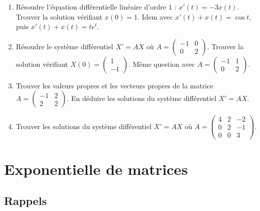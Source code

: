 \documentclass[12pt, class=report,crop=false]{standalone}
\begin{document}
\begin{miniexercices}
\sauteligne
\begin{enumerate}
  \item Résoudre l'équation différentielle linéaire d'ordre $1$ : $x'(t) = -3x(t)$.
  Trouver la solution vérifiant $x(0)=1$.
   Idem avec $x'(t)+x(t) = \cos t$, puis $x'(t) +x(t) = te^t$.
   
  \item Résoudre le système différentiel $X'=AX$ où
  $A = \left(\begin{smallmatrix}-1&0\\0&2\end{smallmatrix}\right)$. Trouver la solution vérifiant 
  $X(0) = \left(\begin{smallmatrix}1\\-1\end{smallmatrix}\right)$.
  Même question avec $A = \left(\begin{smallmatrix}-1&1\\0&2\end{smallmatrix}\right)$.
  
  \item Trouver les valeurs propres et les vecteurs propres de la matrice
  $A = \left(\begin{smallmatrix}-1&2\\2&2\end{smallmatrix}\right)$. En déduire les solutions du système différentiel $X'=AX$.
  
  \item Trouver les solutions du système différentiel $X'=AX$ où
  $A = \left(\begin{smallmatrix}4&2&-2\\0&2&-1\\0&0&3\end{smallmatrix}\right)$.
\end{enumerate}
\end{miniexercices}





\section{Exponentielle de matrices}


\subsection{Rappels}
\end{document}
